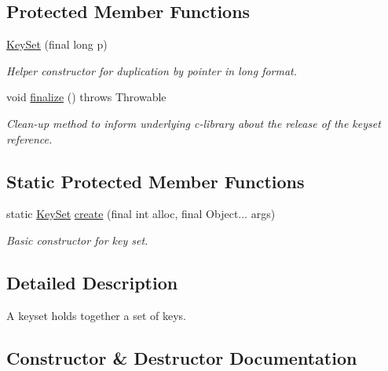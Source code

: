 \subsection*{Protected Member Functions}
\begin{DoxyCompactItemize}
\item 
\mbox{\hyperlink{classorg_1_1libelektra_1_1KeySet_a72507fbeb96bfb90e44562e0a8e70331}{Key\+Set}} (final long p)
\begin{DoxyCompactList}\small\item\em Helper constructor for duplication by pointer in long format. \end{DoxyCompactList}\item 
\mbox{\label{classorg_1_1libelektra_1_1KeySet_ad11eed8c4aeea5b9af381e0185b3a097}} 
void \mbox{\hyperlink{classorg_1_1libelektra_1_1KeySet_ad11eed8c4aeea5b9af381e0185b3a097}{finalize}} ()  throws Throwable 	
\begin{DoxyCompactList}\small\item\em Clean-\/up method to inform underlying c-\/library about the release of the keyset reference. \end{DoxyCompactList}\end{DoxyCompactItemize}
\subsection*{Static Protected Member Functions}
\begin{DoxyCompactItemize}
\item 
static \mbox{\hyperlink{classorg_1_1libelektra_1_1KeySet}{Key\+Set}} \mbox{\hyperlink{classorg_1_1libelektra_1_1KeySet_ae3f1cd9ac1a4fd2ef7d16e6c320bc6a3}{create}} (final int alloc, final Object... args)
\begin{DoxyCompactList}\small\item\em Basic constructor for key set. \end{DoxyCompactList}\end{DoxyCompactItemize}


\subsection{Detailed Description}
A keyset holds together a set of keys. 

\subsection{Constructor \& Destructor Documentation}
\mbox{\label{classorg_1_1libelektra_1_1KeySet_a72507fbeb96bfb90e44562e0a8e70331}} 

